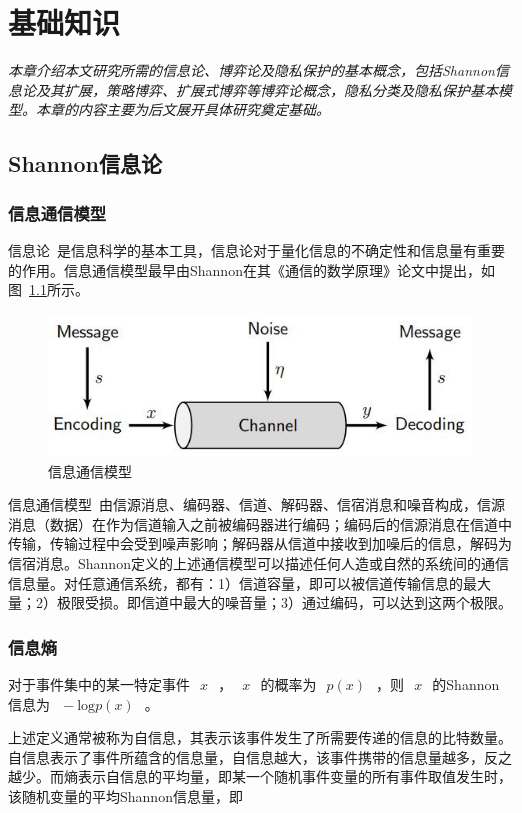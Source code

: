 \chapter{基础知识}
\label{chap:preliminary}

\textit{}

\textit{本章介绍本文研究所需的信息论、博弈论及隐私保护的基本概念，包括Shannon信息论及其扩展，策略博弈、扩展式博弈等博弈论概念，隐私分类及隐私保护基本模型。本章的内容主要为后文展开具体研究奠定基础。}
\section{Shannon信息论}

\subsection{信息通信模型}
信息论~\cite{shannon1948mathematical,
	stone2018information}是信息科学的基本工具，信息论对于量化信息的不确定性和信息量有重要的作用。信息通信模型最早由Shannon在其《通信的数学原理》论文中提出，如图~\ref{fig:communication-model}所示。

\begin{figure}[htbp]
	\centering
	\includegraphics[width = 0.6\linewidth]{./figures/shannon-communicaiton-model.jpg}
	\caption{信息通信模型~\cite{stone2018information}
	}
	\label{fig:communication-model}
\end{figure}

信息通信模型~\cite{stone2018information}由信源消息、编码器、信道、解码器、信宿消息和噪音构成，信源消息（数据）在作为信道输入之前被编码器进行编码；编码后的信源消息在信道中传输，传输过程中会受到噪声影响；解码器从信道中接收到加噪后的信息，解码为信宿消息。Shannon定义的上述通信模型可以描述任何人造或自然的系统间的通信信息量。对任意通信系统，都有：1）信道容量，即可以被信道传输信息的最大量；2）极限受损。即信道中最大的噪音量；3）通过编码，可以达到这两个极限。



\subsection{信息熵}


\begin{definition}
	对于事件集中的某一特定事件~$~x~$~，~$~x~$~的概率为~$~p(x)~$~，则~$~x~$~的Shannon信息为~$~-\text{log}p(x)~$~。
\end{definition}
上述定义通常被称为自信息，其表示该事件发生了所需要传递的信息的比特数量。自信息表示了事件所蕴含的信息量，自信息越大，该事件携带的信息量越多，反之越少。而熵表示自信息的平均量，即某一个随机事件变量的所有事件取值发生时，该随机变量的平均Shannon信息量，即

